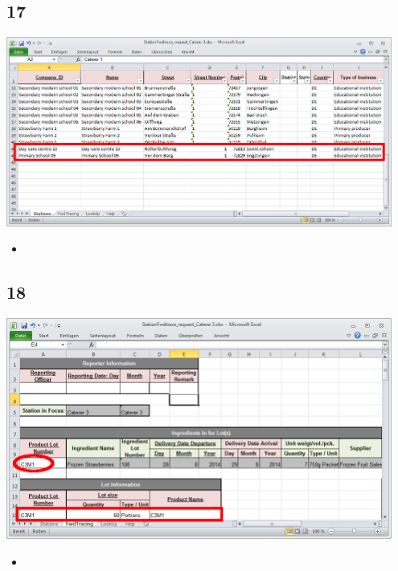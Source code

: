 \documentclass{beamer}
\begin{document}
\subsection{17}
\begin{frame}
	\begin{center}
  		\includegraphics[width=0.95\textwidth]{17.png}
	\end{center}
	\begin{itemize}
		\item
	\end{itemize}
\end{frame}

\subsection{18}
\begin{frame}
	\begin{center}
  		\includegraphics[width=0.95\textwidth]{18.png}
	\end{center}
	\begin{itemize}
		\item
	\end{itemize}
\end{frame}
\end{document}
